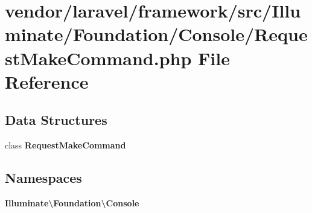 \section{vendor/laravel/framework/src/\+Illuminate/\+Foundation/\+Console/\+Request\+Make\+Command.php File Reference}
\label{_request_make_command_8php}
\subsection*{Data Structures}
\begin{DoxyCompactItemize}
\item 
class {\bf Request\+Make\+Command}
\end{DoxyCompactItemize}
\subsection*{Namespaces}
\begin{DoxyCompactItemize}
\item 
 {\bf Illuminate\textbackslash{}\+Foundation\textbackslash{}\+Console}
\end{DoxyCompactItemize}
